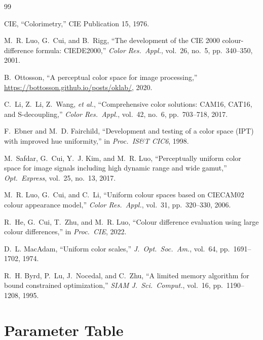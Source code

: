 \documentclass[11pt, twocolumn]{article}
\begin{document}

\begin{thebibliography}{99}

CIE, ``Colorimetry,'' CIE Publication 15, 1976.

M.~R. Luo, G.~Cui, and B.~Rigg, ``The development of the CIE 2000
colour-difference formula: CIEDE2000,'' \textit{Color Res.\ Appl.},
vol.~26, no.~5, pp.~340--350, 2001.

B.~Ottosson, ``A perceptual color space for image processing,''
\url{https://bottosson.github.io/posts/oklab/}, 2020.

C.~Li, Z.~Li, Z.~Wang, \textit{et al.}, ``Comprehensive color
solutions: CAM16, CAT16, and S-decoupling,'' \textit{Color Res.\
Appl.}, vol.~42, no.~6, pp.~703--718, 2017.

F.~Ebner and M.~D. Fairchild, ``Development and testing of a color
space (IPT) with improved hue uniformity,'' in \textit{Proc.\ IS\&T
CIC6}, 1998.

M.~Safdar, G.~Cui, Y.~J. Kim, and M.~R. Luo, ``Perceptually uniform
color space for image signals including high dynamic range and wide
gamut,'' \textit{Opt.\ Express}, vol.~25, no.~13, 2017.

M.~R. Luo, G.~Cui, and C.~Li, ``Uniform colour spaces based on
CIECAM02 colour appearance model,'' \textit{Color Res.\ Appl.},
vol.~31, pp.~320--330, 2006.

R.~He, G.~Cui, T.~Zhu, and M.~R. Luo, ``Colour difference
evaluation using large colour differences,'' in \textit{Proc.\ CIE},
2022.

D.~L. MacAdam, ``Uniform color scales,'' \textit{J.\ Opt.\ Soc.\
Am.}, vol.~64, pp.~1691--1702, 1974.

R.~H. Byrd, P.~Lu, J.~Nocedal, and C.~Zhu, ``A limited memory
algorithm for bound constrained optimization,'' \textit{SIAM J.\ Sci.\
Comput.}, vol.~16, pp.~1190--1208, 1995.

\end{thebibliography}


\appendix
\section{Parameter Table}
\label{app:params}
\end{document}
